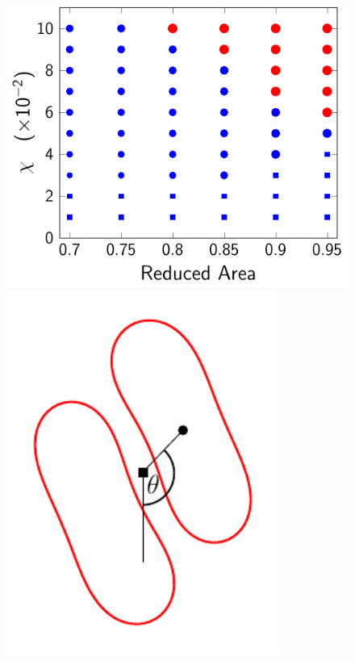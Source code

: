 \documentclass[prf,superscriptaddress,showpacs]{revtex4-1}
\begin{document}
\begin{figure}[htp]
  \begin{minipage}{0.63\textwidth}
    \centering
    \includegraphics[width=\textwidth]{figs/extensional_adR4em1adS7em1_phaseDiagram.pdf}
  \end{minipage}
  \hfill
  \begin{minipage}{0.35\textwidth}
    \centering
    \includegraphics[width=0.8\textwidth]{figs/angleDefinition.pdf}

\end{minipage}
\end{figure}
\end{document}
